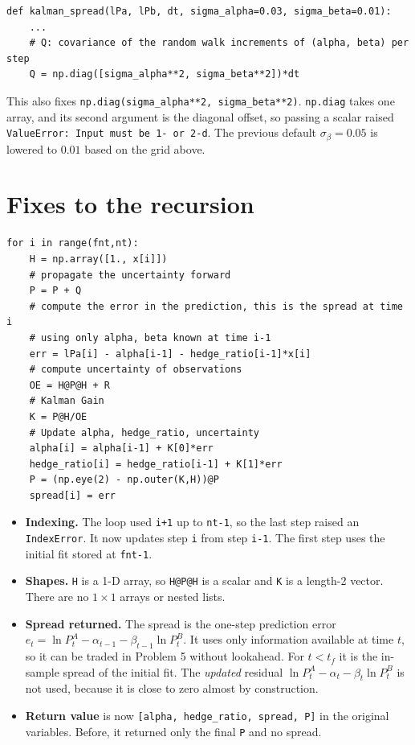 \documentclass[11pt]{article}
\begin{document}
\begin{lstlisting}
def kalman_spread(lPa, lPb, dt, sigma_alpha=0.03, sigma_beta=0.01):
    ...
    # Q: covariance of the random walk increments of (alpha, beta) per step
    Q = np.diag([sigma_alpha**2, sigma_beta**2])*dt
\end{lstlisting}
This also fixes \texttt{np.diag(sigma\_alpha**2, sigma\_beta**2)}.
\texttt{np.diag} takes one array, and its second argument is the diagonal
offset, so passing a scalar raised
\texttt{ValueError: Input must be 1- or 2-d}. The previous default $\sigma_\beta = 0.05$ is
lowered to $0.01$ based on the grid above.

\section{Fixes to the recursion}

\begin{lstlisting}
for i in range(fnt,nt):
    H = np.array([1., x[i]])
    # propagate the uncertainty forward
    P = P + Q
    # compute the error in the prediction, this is the spread at time i
    # using only alpha, beta known at time i-1
    err = lPa[i] - alpha[i-1] - hedge_ratio[i-1]*x[i]
    # compute uncertainty of observations
    OE = H@P@H + R
    # Kalman Gain
    K = P@H/OE
    # Update alpha, hedge_ratio, uncertainty
    alpha[i] = alpha[i-1] + K[0]*err
    hedge_ratio[i] = hedge_ratio[i-1] + K[1]*err
    P = (np.eye(2) - np.outer(K,H))@P
    spread[i] = err
\end{lstlisting}

\begin{itemize}
    \item \textbf{Indexing.} The loop used \texttt{i+1} up to \texttt{nt-1},
    so the last step raised an \texttt{IndexError}. It now updates step
    \texttt{i} from step \texttt{i-1}. The first step uses the initial fit
    stored at \texttt{fnt-1}.
    \item \textbf{Shapes.} \texttt{H} is a 1-D array, so \texttt{H@P@H} is a
    scalar and \texttt{K} is a length-2 vector. There are no $1\times1$ arrays
    or nested lists.
    \item \textbf{Spread returned.} The spread is the one-step prediction
    error $e_t = \ln P^A_t - \alpha_{t-1} - \beta_{t-1}\ln P^B_t$. It uses
    only information available at time $t$, so it can be traded in Problem 5
    without lookahead. For $t < t_f$ it is the in-sample spread of the initial
    fit. The \emph{updated} residual $\ln P^A_t - \alpha_t - \beta_t\ln P^B_t$
    is not used, because it is close to zero almost by construction.
    \item \textbf{Return value} is now
    \texttt{[alpha, hedge\_ratio, spread, P]} in the original variables. Before,
    it returned only the final \texttt{P} and no spread.
\end{itemize}
\end{document}
